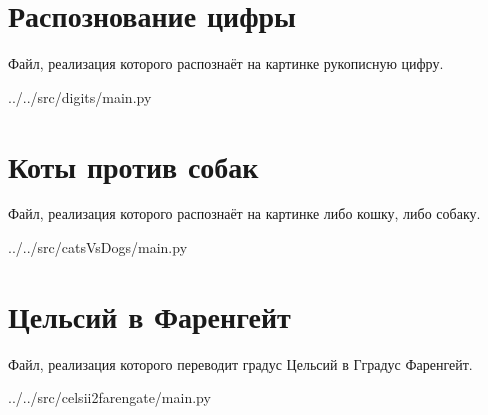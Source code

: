 
\section{Распознование цифры}

Файл, реализация которого распознаёт на картинке рукописную цифру.


{../../src/digits/main.py}

\newpage


\section{Коты против собак}

Файл, реализация которого распознаёт на картинке либо кошку, либо собаку.


{../../src/catsVsDogs/main.py}

\newpage


\section{Цельсий в Фаренгейт}

Файл, реализация которого переводит градус Цельсий в Гградус Фаренгейт.


{../../src/celsii2farengate/main.py}

